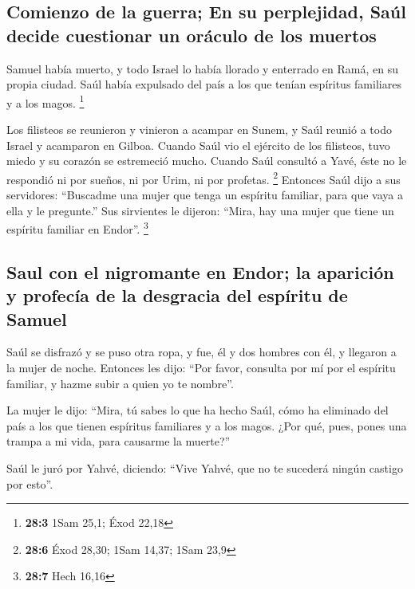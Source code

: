 \hypertarget{comienzo-de-la-guerra-en-su-perplejidad-sauxfal-decide-cuestionar-un-oruxe1culo-de-los-muertos}{%
\subsection{Comienzo de la guerra; En su perplejidad, Saúl decide
cuestionar un oráculo de los
muertos}\label{comienzo-de-la-guerra-en-su-perplejidad-sauxfal-decide-cuestionar-un-oruxe1culo-de-los-muertos}}

 Samuel había muerto, y todo Israel lo había llorado y
enterrado en Ramá, en su propia ciudad. Saúl había expulsado del país a
los que tenían espíritus familiares y a los magos. \footnote{\textbf{28:3}
  1Sam 25,1; Éxod 22,18}

 Los filisteos se reunieron y vinieron a acampar en Sunem,
y Saúl reunió a todo Israel y acamparon en Gilboa.  Cuando
Saúl vio el ejército de los filisteos, tuvo miedo y su corazón se
estremeció mucho.  Cuando Saúl consultó a Yavé, éste no le
respondió ni por sueños, ni por Urim, ni por profetas. \footnote{\textbf{28:6}
  Éxod 28,30; 1Sam 14,37; 1Sam 23,9}  Entonces Saúl dijo a
sus servidores: ``Buscadme una mujer que tenga un espíritu familiar,
para que vaya a ella y le pregunte.'' Sus sirvientes le dijeron: ``Mira,
hay una mujer que tiene un espíritu familiar en Endor''. \footnote{\textbf{28:7}
  Hech 16,16}

\hypertarget{saul-con-el-nigromante-en-endor-la-apariciuxf3n-y-profecuxeda-de-la-desgracia-del-espuxedritu-de-samuel}{%
\subsection{Saul con el nigromante en Endor; la aparición y profecía de
la desgracia del espíritu de
Samuel}\label{saul-con-el-nigromante-en-endor-la-apariciuxf3n-y-profecuxeda-de-la-desgracia-del-espuxedritu-de-samuel}}

 Saúl se disfrazó y se puso otra ropa, y fue, él y dos
hombres con él, y llegaron a la mujer de noche. Entonces les dijo: ``Por
favor, consulta por mí por el espíritu familiar, y hazme subir a quien
yo te nombre''.

 La mujer le dijo: ``Mira, tú sabes lo que ha hecho Saúl,
cómo ha eliminado del país a los que tienen espíritus familiares y a los
magos. ¿Por qué, pues, pones una trampa a mi vida, para causarme la
muerte?''

 Saúl le juró por Yahvé, diciendo: ``Vive Yahvé, que no
te sucederá ningún castigo por esto''.

